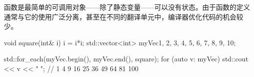 函数是最简单的可调用对象——除了静态变量——可以没有状态。由于函数的定义通常与它的使用广泛分离，甚至在不同的翻译单元中，编译器优化代码的机会较少。

\begin{cpp}
void square(int& i){ i = i*i; }
std::vector<int> myVec{1, 2, 3, 4, 5, 6, 7, 8, 9, 10};

std::for_each(myVec.begin(), myVec.end(), square);
for (auto v: myVec) std::cout << v << " "; // 1 4 9 16 25 36 49 64 81 100
\end{cpp}






